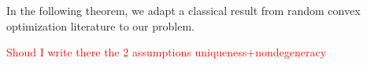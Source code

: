 %
In the following theorem, we adapt a classical result from random convex optimization literature to our problem.

\textcolor{red}{Shoud I write there the 2 assumptions uniqueness+nondegeneracy}

